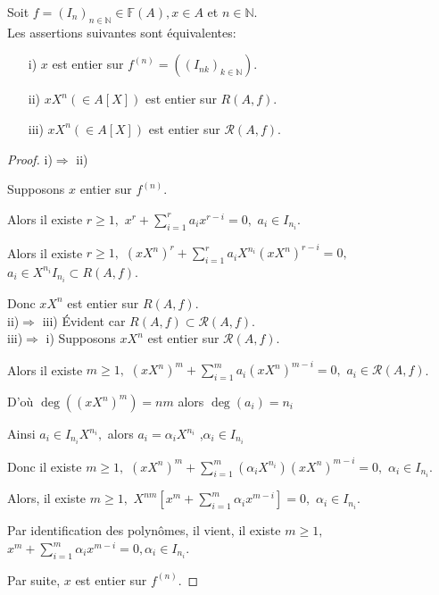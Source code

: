 \begin{maproposition}
	Soit $f=(I_n)_{n \in \mathbb{N}} \in \mathbb{F}(A), x \in A $ et $n \in \mathbb{N}$.\\
	Les assertions suivantes sont équivalentes: \\
	\begin{enumerate}
		\item[i)] $x$ est entier sur $f^{(n)}=((I_{nk})_{k \in \mathbb{N}})$.
		\item[ii)] $xX^n(\in A[X])$ est entier sur $R(A,f)$.
		\item[iii)] $xX^n(\in A[X])$ est entier sur $ \mathcal{R}(A,f)$.
	\end{enumerate}
	\begin{proof}
		i)$\Rightarrow$ ii)
		
		Supposons $x$ entier sur $f^{(n)}$.
		
		Alors il existe $r\geq 1,$ $x^{r}+\sum\limits_{i=1}^{r}a_{i}x^{r-i}=0,$ $%
		a_{i}\in I_{n_{i}}$.
		
		Alors il existe $r\geq 1,$ $(xX^{n})^{r}+\sum%
		\limits_{i=1}^{r}a_{i}X^{n_{i}}(xX^{n})^{r-i}=0,$ $a_{i}\in
		X^{n_{i}}I_{n_{i}}\subset R(A,f)$.
		
		Donc $xX^{n}$ est entier sur $R(A,f).$ \\
		
		ii)$\Rightarrow$ iii) Évident car $R(A,f)\subset \mathcal{R}(A,f).$ \\
		iii)$\Rightarrow$ i) Supposons $xX^{n}$ est entier sur $\mathcal{R}(A,f).$
		
		Alors il existe $m\geq 1,$ $(xX^{n})^{m}+\sum\limits_{i=1}^{m}a_{i}(xX^{n})^{m-i}=0,$ $a_{i}\in \mathcal{R}(A,f)$.
		
		D'où $\deg ((xX^{n})^{m})=nm$ alors $\deg (a_{i})=n_{i}$
		
		Ainsi $a_{i}\in I_{n_{i}}X^{n_{i}},$ alors $a_{i}=\alpha _{i}X^{n_{i}}$ ,$\alpha _{i}\in I_{n_{i}}$
		
		Donc il existe $m\geq 1,$ $(xX^{n})^{m}+\sum\limits_{i=1}^{m}(\alpha
		_{i}X^{n_{i}})(xX^{n})^{m-i}=0,$ $\alpha _{i}\in I_{n_{i}}$.
		
		Alors, il existe $m\geq 1,$ $X^{nm}[x^{m}+\sum\limits_{i=1}^{m}\alpha
		_{i}x^{m-i}]=0,$ $\alpha _{i}\in I_{n_{i}}$.
		
		Par identification des polynômes, il vient, il existe $m\geq 1,$ $%
		x^{m}+\sum\limits_{i=1}^{m}\alpha _{i}x^{m-i}=0,\alpha _{i}\in I_{n_{i}}$.
		
		Par suite, $x$ est entier sur $f^{(n)}$.
	\end{proof}
\end{maproposition}

